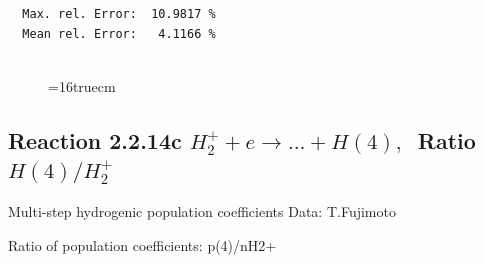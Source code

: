 \documentclass[12pt,dvips]{article}
\begin{document}
\begin{small}
\begin{verbatim}
  Max. rel. Error:  10.9817 %
  Mean rel. Error:   4.1166 %


\end{verbatim}\end{small}
\begin{figure} \label{2.2.14b}
\epsfxsize=16truecm
\end{figure}
\newpage

\subsection{
Reaction 2.2.14c $ H_2^+ + e \rightarrow ...+ H(4) , \   $
Ratio $H(4)/H_2^+  $
}

 Multi-step hydrogenic population coefficients
 Data: T.Fujimoto

 Ratio of population coefficients: p(4)/nH2+
\end{document}
